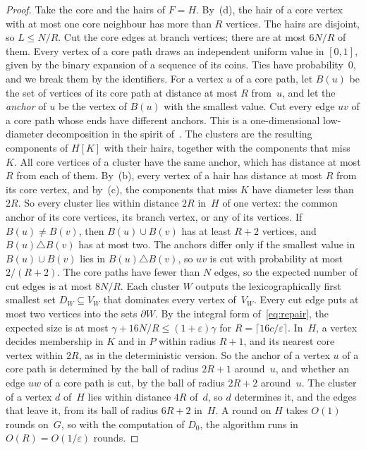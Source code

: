 \documentclass[11pt]{article}
\theoremstyle{remark}
\begin{document}
\begin{proof}
Take the core and the hairs of $F=H$. By~(d), the hair of a core vertex with at most one
core neighbour has more than $R$ vertices. The hairs are disjoint, so $L\le N/R$. Cut the core edges at
branch vertices; there are at most $6N/R$ of them. Every vertex of a core path draws an independent
uniform value in $[0,1]$, given by the binary expansion of a sequence of its coins. Ties have
probability~$0$, and we break them by the identifiers. For a vertex $u$ of a core path, let $B(u)$ be the set of vertices of its
core path at distance at most $R$ from~$u$, and let the \emph{anchor} of $u$ be the vertex of $B(u)$
with the smallest value. Cut every edge $uv$ of a core path whose ends have different anchors. This is
a one-dimensional low-diameter decomposition in the spirit of~\cite{MPX13}. The clusters are the
resulting components of $H[K]$ with their hairs, together with the components that miss~$K$. All core
vertices of a cluster have the same anchor, which has distance at most $R$ from each of them. By~(b),
every vertex of a hair has distance at most $R$ from its core vertex, and by~(c), the components that
miss $K$ have diameter less than $2R$. So every cluster lies within distance $2R$ in~$H$ of one
vertex: the common anchor of its core vertices, its branch vertex, or any of its vertices. If
$B(u)\ne B(v)$, then $B(u)\cup B(v)$ has at least $R+2$ vertices, and $B(u)\triangle B(v)$ has at most
two. The anchors differ only if the smallest value in $B(u)\cup B(v)$ lies in $B(u)\triangle B(v)$, so
$uv$ is cut with probability at most $2/(R+2)$. The core paths have fewer than $N$ edges, so the
expected number of cut edges is at most $8N/R$.
Each cluster $W$ outputs the lexicographically first smallest set $D_W\subseteq V_W$ that
dominates every vertex of~$V_W$. Every cut edge puts at most two vertices into the sets $\partial W$.
By the integral form of~\eqref{eq:repair}, the expected size is at most
$\gamma+16N/R\le(1+\varepsilon)\gamma$ for $R=\lceil16c/\varepsilon\rceil$. In~$H$, a vertex decides
membership in $K$ and in $P$ within radius $R+1$, and its nearest core vertex within $2R$, as in the
deterministic version. So the anchor of a vertex $u$ of a core path is determined by the ball of
radius $2R+1$ around~$u$, and whether an edge $uw$ of a core path is cut, by the ball of radius
$2R+2$ around~$u$. The cluster of a vertex $d$ of~$H$ lies within distance $4R$ of~$d$, so $d$
determines it, and the edges that leave it, from its ball of radius $6R+2$ in~$H$. A round on $H$
takes $O(1)$ rounds on~$G$, so with the computation of $D_0$, the algorithm runs in
$O(R)=O(1/\varepsilon)$ rounds.
\end{proof}
\end{document}
